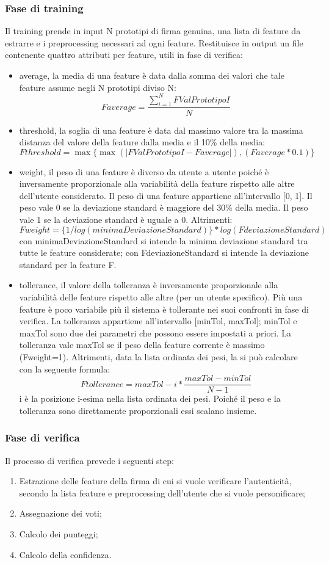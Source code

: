 \subsubsection*{Fase di training}
\label{2.1.4.1}
Il training prende in input N prototipi di firma genuina, una lista di feature da estrarre e i preprocessing necessari ad ogni feature. Restituisce in output un file contenente quattro attributi per feature, utili in fase di verifica:
\begin{itemize}
\item average, la media di una feature è data dalla somma dei valori che tale feature assume negli N prototipi diviso N:
\[Faverage =
\frac{\sum\limits_{i=1}^N FValPrototipoI}{N}
\]
\item threshold, la soglia di una feature è data dal massimo valore tra la massima distanza del valore della feature dalla media e il 10\% della media:
\[Fthreshold = 
\max\{\max(|FValPrototipoI - Faverage|),(Faverage * 0.1)\}
\]
\item weight, il peso di una feature è diverso da utente a utente poiché è inversamente proporzionale alla variabilità della feature rispetto alle altre dell'utente considerato. Il peso di una feature appartiene all'intervallo [0, 1]. Il peso vale 0 se la deviazione standard è maggiore del 30\% della media. Il peso vale 1 se la deviazione standard è uguale a 0. Altrimenti:
\[Fweight = \{ 1 / log(minimaDeviazioneStandard)\} * log(FdeviazioneStandard)\]
con minimaDeviazioneStandard si intende la minima deviazione standard tra tutte le feature considerate; con FdeviazioneStandard si intende la deviazione standard per la feature F.
\item tollerance, il valore della tolleranza è inversamente proporzionale alla variabilità delle feature rispetto alle altre (per un utente specifico). Più una feature è poco variabile più il sistema è tollerante nei suoi confronti in fase di verifica. La tolleranza appartiene all'intervallo [minTol, maxTol]; minTol e maxTol sono due dei parametri che possono essere impostati a priori. La tolleranza vale maxTol se il peso della feature corrente è massimo (Fweight=1). Altrimenti, data la lista ordinata dei pesi, la si può calcolare con la seguente formula:
\[Ftollerance=maxTol - i * \frac{maxTol - minTol}{N-1}\]
i è la posizione i-esima nella lista ordinata dei pesi. Poiché il peso e la tolleranza sono direttamente proporzionali essi scalano insieme.
\end{itemize}
\subsubsection*{Fase di verifica}
\label{2.1.4.2}
Il processo di verifica prevede i seguenti step:
\begin{enumerate}
\item Estrazione delle feature della firma di cui si vuole verificare l’autenticità, secondo la lista feature e preprocessing dell’utente che si vuole personificare;
\item Assegnazione dei voti;
\item Calcolo dei punteggi;
\item Calcolo della confidenza.
\end{enumerate}
